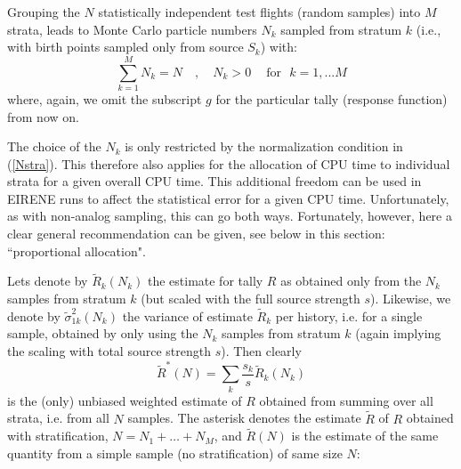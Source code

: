 Grouping the $N$ statistically independent test flights (random samples) into $M$ strata, leads to Monte Carlo particle
numbers $N_k$ sampled from stratum $k$ (i.e., with birth points sampled only from source $S_k$) with:
\begin{equation}\label{Nstra}
\sum_{k=1}^{M} N_k = N   \quad , \quad  N_k > 0 ~ \quad \mbox{for}~~ ~ k=1,...M
\end{equation}
where, again, we omit the subscript $g$ for the particular tally (response function) from now on.

The choice of the $N_k$
is only restricted by the normalization condition in (\ref{Nstra}).
This therefore also applies for the allocation of CPU time to individual strata for a given overall CPU time.
This additional freedom can be used in EIRENE runs to affect the statistical error for a given CPU time.
Unfortunately, as with non-analog sampling, this can go both ways. Fortunately, however, here a clear general
recommendation can be given, see below in this section: ``proportional allocation".

Lets denote by
$\tilde R_k(N_k)$ the estimate for tally $R$ as obtained only from the $N_k$ samples from stratum $k$ (but scaled with
the full source strength $s$). Likewise, we denote by
$ \tilde \sigma^2_{1k}(N_k)$ the variance of estimate $\tilde R_k$ per history, i.e. for a single sample,
obtained by only using the $N_k$ samples from stratum $k$ (again implying the scaling with total source strength $s$).
 Then clearly
\begin{equation}
\tilde R^*(N) =\sum_k  \frac {s_k}{s} \tilde R_k(N_k)
\end{equation}
is the (only) unbiased weighted estimate of $R$ obtained from summing over all strata, i.e. from all $N$ samples.
The asterisk denotes the estimate $\tilde R$ of $R$ obtained with stratification, $N=N_1+\dots + N_M$, and $\tilde R(N)$ is the estimate
of the same quantity from a simple sample (no stratification) of same size $N$:

